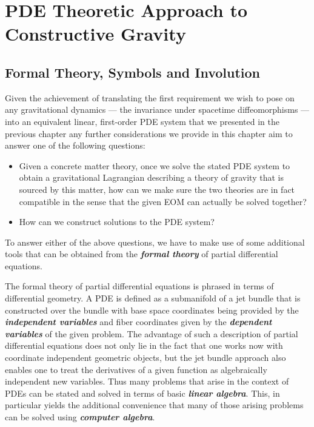 \documentclass[a4paper,12pt, DIV=14, BCOR=5mm, twoside, headsepline, numbers=noenddot]{scrbook}
\begin{document}
\chapter{PDE Theoretic Approach to Constructive Gravity}
\section{Formal Theory, Symbols and Involution}
Given the achievement of translating the first requirement we wish to pose on any gravitational dynamics --- the invariance under spacetime diffeomorphisms --- into an equivalent linear, first-order PDE system that we presented in the previous chapter any further considerations we provide in this chapter aim to answer one of the following questions:
\begin{itemize}
    \item Given a concrete matter theory, once we solve the stated PDE system to obtain a gravitational Lagrangian describing a theory of gravity that is sourced by this matter, how can we make sure the two theories are in fact compatible in the sense that the given EOM can actually be solved together?
    \item How can we construct solutions to the PDE system?
\end{itemize}
To answer either of the above questions, we have to make use of some additional tools that can be obtained from the \textit{\textbf{formal theory}} of partial differential equations.

The formal theory of partial differential equations is phrased in terms of differential geometry. A PDE is defined as a submanifold of a jet bundle that is constructed over the bundle with base space coordinates being provided by the \textit{\textbf{independent variables}} and fiber coordinates given by the \textit{\textbf{dependent variables}} of the given problem. The advantage of such a description of partial differential equations does not only lie in the fact that one works now with coordinate independent geometric objects, but the jet bundle approach also enables one to treat the derivatives of a given function as algebraically independent new variables. Thus many problems that arise in the context of PDEs can be stated and solved in terms of basic \textit{\textbf{linear algebra}}. This, in particular yields the additional convenience that many of those arising problems can be solved using \textbf{\textit{computer algebra}}.
\end{document}
